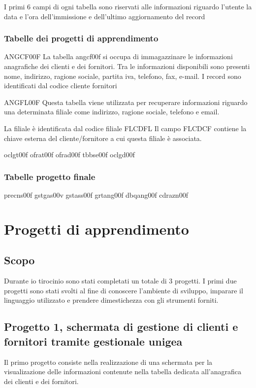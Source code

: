 \documentclass[target=bach,aauheader=,style=]{thud}
\begin{document}
I primi 6 campi di ogni tabella sono riservati alle informazioni riguardo l'utente la data e l'ora dell'immissione e dell'ultimo aggiornamento del record

\subsection{Tabelle dei progetti di apprendimento}
ANGCF00F
La tabella angcf00f si occupa di immagazzinare le informazioni anagrafiche dei clienti e dei fornitori. 
Tra le informazioni disponibili sono presenti nome, indirizzo, ragione sociale, partita iva, telefono, fax, e-mail.
I record sono identificati dal codice cliente fornitori

ANGFL00F
Questa tabella viene utilizzata per recuperare informazioni riguardo una determinata filiale come indirizzo, ragione sociale, telefono e email.

La filiale è identificata dal codice filiale FLCDFL
Il campo FLCDCF contiene la chiave esterna del cliente/fornitore a cui questa filiale è associata.

oclgt00f 
ofrat00f
ofrad00f
tbbse00f
oclgd00f
\subsection{Tabelle progetto finale}
precns00f %
gstgas00v
gstass00f
grtang00f
dbqang00f 
cdrazn00f %



\chapter{Progetti di apprendimento}
\section{Scopo}
Durante io tirocinio sono stati completati un totale di 3 progetti.
I primi due progetti sono stati svolti al fine di conoscere l'ambiente di sviluppo, imparare il linguaggio utilizzato e prendere dimestichezza con gli strumenti forniti.

\section{Progetto 1, schermata di gestione di clienti e fornitori tramite gestionale unigea}
Il primo progetto consiste nella realizzazione di una schermata per la visualizazione delle informazioni contenute nella tabella dedicata all'anagrafica dei clienti e dei fornitori.
\end{document}
